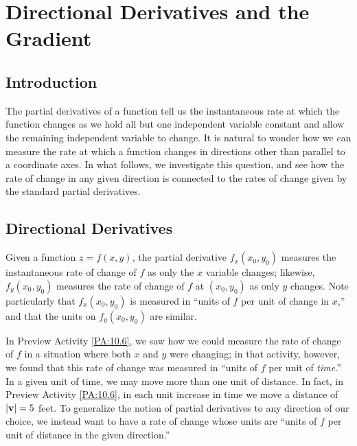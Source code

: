 \section{Directional Derivatives and the Gradient} \label{S:10.6.Directional_Derivative} 

\vspace*{-14 pt}

\subsection*{Introduction}

The partial derivatives of a function tell us the instantaneous rate at which the function changes as we hold all but one independent variable constant and allow the remaining independent variable to change.   It is natural to wonder how we can measure the rate at which a function changes in directions other than parallel to a coordinate axes.  In what follows, we investigate this question, and see how the rate of change in any given direction is connected to the rates of change given by the standard partial derivatives.



\subsection*{Directional Derivatives}

Given a function $z = f(x,y)$, the partial derivative $f_x(x_0,y_0)$ measures the instantaneous rate of change of $f$ as only the $x$ variable changes; likewise, $f_y(x_0,y_0)$ measures the rate of change of $f$ at $(x_0,y_0)$ as only $y$ changes.  Note particularly that $f_x(x_0,y_0)$ is measured in ``units of $f$ per unit of change in $x$,'' and that the units on $f_y(x_0,y_0)$ are similar.  

In Preview Activity \ref{PA:10.6}, we saw how we could measure the rate of change of $f$ in a situation where both $x$ and $y$ were changing; in that activity, however, we found that this rate of change was measured in ``units of $f$ per unit of \emph{time}.'' In a given unit of time, we may move more than one unit of distance. In fact, in Preview Activity \ref{PA:10.6}, in each unit increase in time we move a distance of $| \mathbf{v} | = 5$ feet. To generalize the notion of partial derivatives to any direction of our choice, we instead want to have a rate of change whose units are ``units of $f$ per unit of distance in the given direction.'' 

